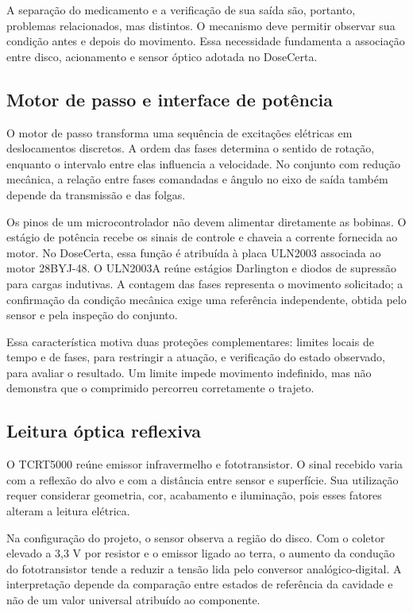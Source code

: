 A separação do medicamento e a verificação de sua saída são, portanto, problemas relacionados, mas distintos. O mecanismo deve permitir observar sua condição antes e depois do movimento. Essa necessidade fundamenta a associação entre disco, acionamento e sensor óptico adotada no DoseCerta.

\subsection{Motor de passo e interface de potência}
O motor de passo transforma uma sequência de excitações elétricas em deslocamentos discretos. A ordem das fases determina o sentido de rotação, enquanto o intervalo entre elas influencia a velocidade. No conjunto com redução mecânica, a relação entre fases comandadas e ângulo no eixo de saída também depende da transmissão e das folgas.

Os pinos de um microcontrolador não devem alimentar diretamente as bobinas. O estágio de potência recebe os sinais de controle e chaveia a corrente fornecida ao motor. No DoseCerta, essa função é atribuída à placa ULN2003 associada ao motor 28BYJ-48. O ULN2003A reúne estágios Darlington e diodos de supressão para cargas indutivas. \cite{TI_ULN2003} A contagem das fases representa o movimento solicitado; a confirmação da condição mecânica exige uma referência independente, obtida pelo sensor e pela inspeção do conjunto.

Essa característica motiva duas proteções complementares: limites locais de tempo e de fases, para restringir a atuação, e verificação do estado observado, para avaliar o resultado. Um limite impede movimento indefinido, mas não demonstra que o comprimido percorreu corretamente o trajeto.

\subsection{Leitura óptica reflexiva}
O TCRT5000 reúne emissor infravermelho e fototransistor. O sinal recebido varia com a reflexão do alvo e com a distância entre sensor e superfície. Sua utilização requer considerar geometria, cor, acabamento e iluminação, pois esses fatores alteram a leitura elétrica. \cite{VISHAY_TCRT}

Na configuração do projeto, o sensor observa a região do disco. Com o coletor elevado a 3,3 V por resistor e o emissor ligado ao terra, o aumento da condução do fototransistor tende a reduzir a tensão lida pelo conversor analógico-digital. A interpretação depende da comparação entre estados de referência da cavidade e não de um valor universal atribuído ao componente.

